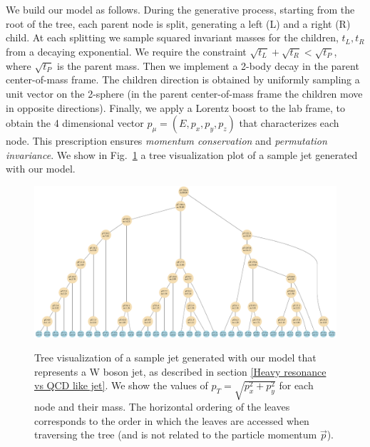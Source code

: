 \documentclass[12pt]{article}
\begin{document}
We build our model as follows. During the generative process, starting from the root of the tree, each parent node is split, generating a left (L) and a right (R) child. At each splitting we sample squared invariant masses for the children, $t_L, t_R$ from a decaying exponential. We require the constraint $\sqrt{t_L} + \sqrt{t_R} < \sqrt{t_P}$, where $\sqrt{t_P}$ is the parent mass. Then we implement a 2-body decay in the parent center-of-mass frame. The children direction is obtained by uniformly sampling a unit vector on the 2-sphere (in the parent center-of-mass frame the children move in opposite directions). Finally, we apply a Lorentz boost to the lab frame, to obtain the 4 dimensional vector $p_{\mu}=(E, p_x, p_y, p_z) $ that characterizes each node.
This prescription ensures {\it momentum conservation} and {\it permutation invariance}.
We show in Fig.~\ref{fig:1DTree} a tree visualization plot of a sample jet generated with our model.



\begin{figure}
{
  \includegraphics[width=\linewidth]{figs/figTruth_jet9_invM.pdf}
}
\caption{\small{Tree visualization of a sample jet generated with our model that represents a W boson jet, as described in section \ref{Heavy resonance vs QCD like jet}. We show the values of $p_T =\sqrt{ p_x^2 +p_y^2}$ for each node and their mass. The horizontal ordering of the leaves corresponds to the order in which the leaves are accessed when traversing the tree (and is not related to the particle momentum $\vec{p}$).
}}
\label{fig:1DTree}
\end{figure}
\end{document}
